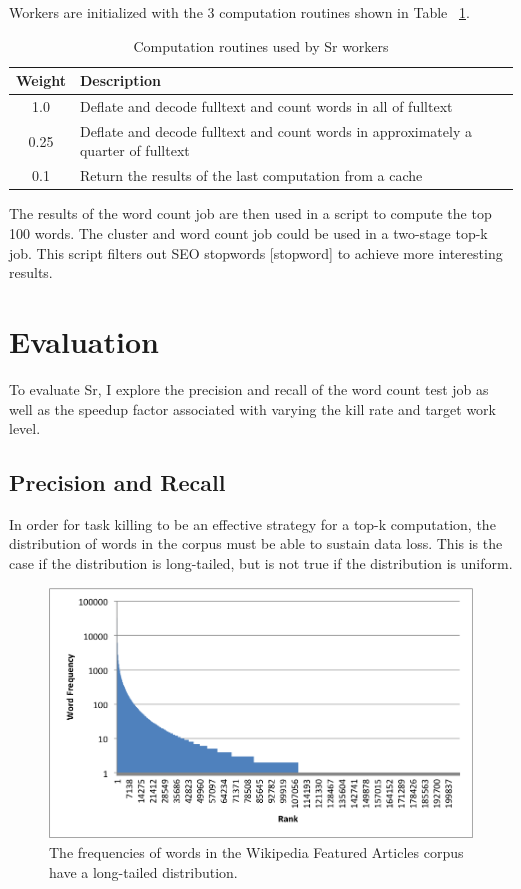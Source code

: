 \documentclass[12pt]{article}
\begin{document}
Workers are initialized with the 3 computation routines shown in Table ~\ref{table:workerTasks}.

\begin{table}
\begin{tabularx}{\linewidth}{|c|X|}
 \hline
Weight & Description \\ \hline
1.0 & Deflate and decode fulltext and count words in all of fulltext \\ \hline
0.25 & Deflate and decode fulltext and count words in approximately a quarter of fulltext \\ \hline
0.1 & Return the results of the last computation from a cache \\ \hline
\end{tabularx}
\caption{Computation routines used by Sr workers}
\label{table:workerTasks}
\end{table}

The results of the word count job are then used in a script to compute the top 100 words. The cluster and word count job could be used in a two-stage top-k job. This script filters out SEO stopwords [stopword] to achieve more interesting results.

\section{Evaluation}
\label{sec:evaluation}
To evaluate Sr, I explore the precision and recall of the word count test job as well as the speedup factor associated with varying the kill rate and target work level.

\subsection{Precision and Recall}
In order for task killing to be an effective strategy for a top-k computation, the distribution of words in the corpus must be able to sustain data loss. This is the case if the distribution is long-tailed, but is not true if the distribution is uniform.

\begin{figure}
\includegraphics[width=\linewidth]{long-tail-ranks.png}
\caption{The frequencies of words in the Wikipedia Featured Articles corpus have a long-tailed distribution.}
\label{fig:wordDist}
\end{figure}
\end{document}
